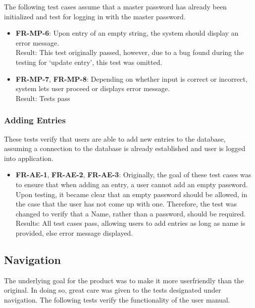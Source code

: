 \documentclass[12pt, titlepage]{article}
\begin{document}
			The following test cases assume that a master password has already been initialized and test for logging in with the master password.\\
			
			\begin{itemize}	 
			
				\item \textbf{FR-MP-6}: Upon entry of an empty string, the system should display an error message.\\
				Result: This test originally passed, however, due to a bug found during the testing for ‘update entry’, this test was omitted.
				
				\item \textbf{FR-MP-7}, \textbf{FR-MP-8}: Depending on whether input is correct or incorrect, system lets user proceed or displays error message.\\
				Result: Tests pass
			
			\end{itemize}

		\subsubsection{Adding Entries}
			These tests verify that users are able to add new entries to the database, assuming a connection to the database is already established and user is logged into application.\\

			\begin{itemize}	

				\item \textbf{FR-AE-1}, \textbf{FR-AE-2}, \textbf{FR-AE-3}: Originally, the goal of these test cases was to ensure that when adding an entry, a user cannot add an empty password. Upon testing, it became clear that an empty password should be allowed, in the case that the user has not come up with one. Therefore, the test was changed to verify that a Name, rather than a password, should be required.\\
				Results: All test cases pass, allowing users to add entries as long as name is provided, else error message displayed. 

			\end{itemize}

	\subsection{Navigation}
		The underlying goal for the product was to make it more userfriendly than the original. In doing so, great care was given to the tests designated under navigation. The following tests verify the functionality of the user manual.\\
		
\end{document}

